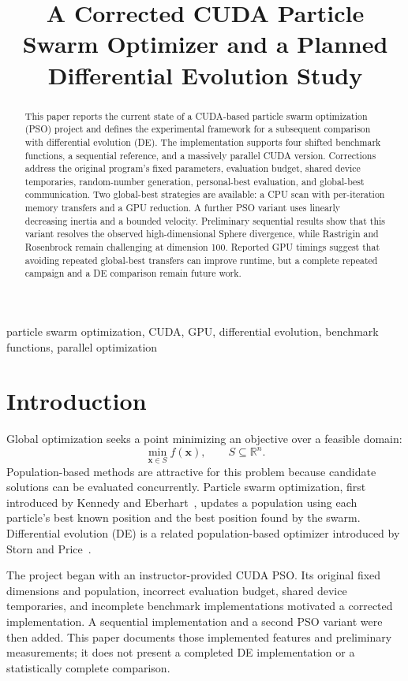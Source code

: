 \documentclass[conference]{IEEEtran}
\title{A Corrected CUDA Particle Swarm Optimizer and a Planned Differential Evolution Study}
\author{
\IEEEauthorblockN{\todo{Author names}}
\IEEEauthorblockA{University of Haute-Alsace\\
\texttt{\todo{Author email addresses}}}
}
\newcommand{\R}{\mathbb{R}}
\begin{document}
\maketitle

\begin{abstract}
This paper reports the current state of a CUDA-based particle swarm
optimization (PSO) project and defines the experimental framework for a
subsequent comparison with differential evolution (DE). The implementation
supports four shifted benchmark functions, a sequential reference, and a
massively parallel CUDA version. Corrections address the original program's
fixed parameters, evaluation budget, shared device temporaries, random-number
generation, personal-best evaluation, and global-best communication. Two
global-best strategies are available: a CPU scan with per-iteration memory
transfers and a GPU reduction. A further PSO variant uses linearly decreasing
inertia and a bounded velocity. Preliminary sequential results show that this
variant resolves the observed high-dimensional Sphere divergence, while
Rastrigin and Rosenbrock remain challenging at dimension 100. Reported GPU
timings suggest that avoiding repeated global-best transfers can improve
runtime, but a complete repeated campaign and a DE comparison remain future
work.
\end{abstract}

\begin{IEEEkeywords}
particle swarm optimization, CUDA, GPU, differential evolution, benchmark
functions, parallel optimization
\end{IEEEkeywords}

\section{Introduction}
Global optimization seeks a point minimizing an objective over a feasible
domain:
\begin{equation}
  \min_{\mathbf{x}\in S} f(\mathbf{x}), \qquad S\subseteq\R^n.
\end{equation}
Population-based methods are attractive for this problem because candidate
solutions can be evaluated concurrently. Particle swarm optimization, first
introduced by Kennedy and Eberhart~\cite{kennedy1995pso}, updates a population
using each particle's best known position and the best position found by the
swarm. Differential evolution (DE) is a related population-based optimizer
introduced by Storn and Price~\cite{storn1997de}.

The project began with an instructor-provided CUDA PSO. Its original fixed
dimensions and population, incorrect evaluation budget, shared device
temporaries, and incomplete benchmark implementations motivated a corrected
implementation. A sequential implementation and a second PSO variant were
then added. This paper documents those implemented features and preliminary
measurements; it does not present a completed DE implementation or a
statistically complete comparison.
\end{document}
